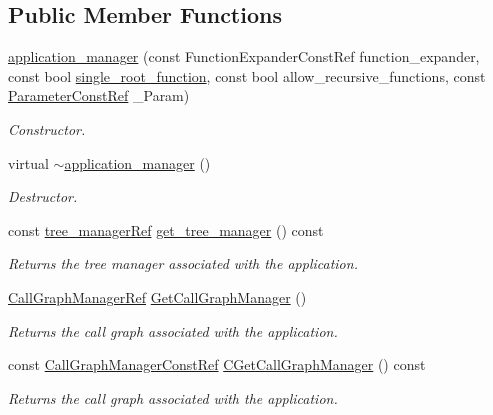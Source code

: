 \subsection*{Public Member Functions}
\begin{DoxyCompactItemize}
\item 
\hyperlink{classapplication__manager_a8940a0e1914fdefcf70357a5fc2efdfb}{application\+\_\+manager} (const Function\+Expander\+Const\+Ref function\+\_\+expander, const bool \hyperlink{classapplication__manager_a02b25f02aeb5258b95c702142953e937}{single\+\_\+root\+\_\+function}, const bool allow\+\_\+recursive\+\_\+functions, const \hyperlink{Parameter_8hpp_a37841774a6fcb479b597fdf8955eb4ea}{Parameter\+Const\+Ref} \+\_\+\+Param)
\begin{DoxyCompactList}\small\item\em Constructor. \end{DoxyCompactList}\item 
virtual \hyperlink{classapplication__manager_a36adbbeba0486764f0765cf417e45c7a}{$\sim$application\+\_\+manager} ()
\begin{DoxyCompactList}\small\item\em Destructor. \end{DoxyCompactList}\item 
const \hyperlink{tree__manager_8hpp_a96ff150c071ce11a9a7a1e40590f205e}{tree\+\_\+manager\+Ref} \hyperlink{classapplication__manager_ab50fd317a5067408db989aa58a4c4507}{get\+\_\+tree\+\_\+manager} () const
\begin{DoxyCompactList}\small\item\em Returns the tree manager associated with the application. \end{DoxyCompactList}\item 
\hyperlink{call__graph__manager_8hpp_aefd741adcd456a04c45fd3df98acdb2c}{Call\+Graph\+Manager\+Ref} \hyperlink{classapplication__manager_a83151669989cf6192423d1e51fd54b3e}{Get\+Call\+Graph\+Manager} ()
\begin{DoxyCompactList}\small\item\em Returns the call graph associated with the application. \end{DoxyCompactList}\item 
const \hyperlink{call__graph__manager_8hpp_a19eec454bbf914c67fe80bcf28e4a90f}{Call\+Graph\+Manager\+Const\+Ref} \hyperlink{classapplication__manager_a087dd36277853a12e84e84da91e82784}{C\+Get\+Call\+Graph\+Manager} () const
\begin{DoxyCompactList}\small\item\em Returns the call graph associated with the application. \end{DoxyCompactList}\item 

\end{DoxyCompactItemize}

